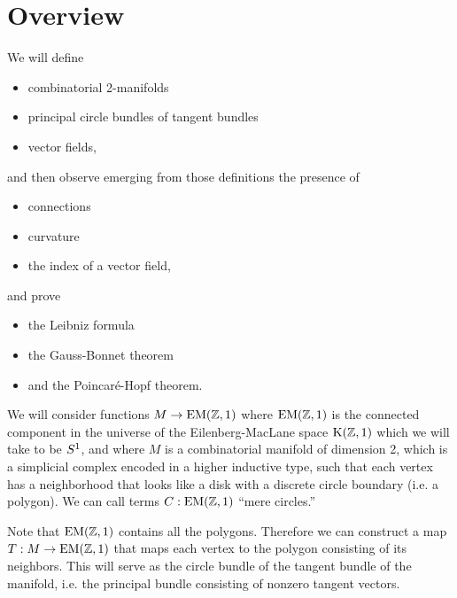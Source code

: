 \section{Overview}
We will define 
\begin{itemize}
\item combinatorial 2-manifolds
\item principal circle bundles of tangent bundles
\item vector fields,
\end{itemize}
and then observe emerging from those definitions the presence of
\begin{itemize}
\item connections
\item curvature
\item the index of a vector field,
\end{itemize}
and prove
\begin{itemize}
\item the Leibniz formula
\item the Gauss-Bonnet theorem
\item and the Poincaré-Hopf theorem.
\end{itemize}

We will consider functions \( M\to \mathrm{EM}(\mathbb{Z},1) \) where \( \mathrm{EM}(\mathbb{Z},1) \) is the connected component in the universe of the Eilenberg-MacLane space \( \mathrm{K}(\mathbb{Z},1) \) which we will take to be \( S^1 \), and where \( M \) is a combinatorial manifold of dimension 2, which is a simplicial complex encoded in a higher inductive type, such that each vertex has a neighborhood that looks like a disk with a discrete circle boundary (i.e. a polygon). We can call terms \( C:\mathrm{EM}(\mathbb{Z},1) \) ``mere circles.''

Note that \( \mathrm{EM}(\mathbb{Z},1) \) contains all the polygons. Therefore we can construct a map \( T:M\to\mathrm{EM}(\mathbb{Z},1) \) that maps each vertex to the polygon consisting of its neighbors. This will serve as the circle bundle of the tangent bundle of the manifold, i.e. the principal bundle consisting of nonzero tangent vectors.

